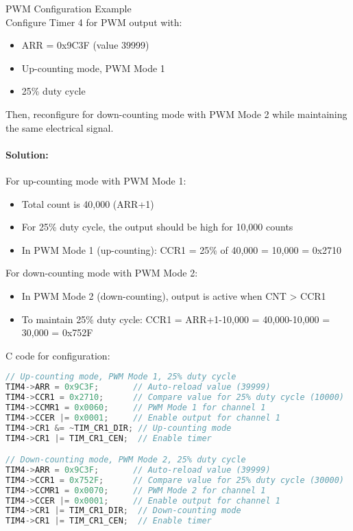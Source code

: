 \begin{example2}{PWM Configuration Example}\\
Configure Timer 4 for PWM output with:
\begin{itemize}
    \item ARR = 0x9C3F (value 39999)
    \item Up-counting mode, PWM Mode 1
    \item 25\% duty cycle
\end{itemize}

Then, reconfigure for down-counting mode with PWM Mode 2 while maintaining the same electrical signal.

\paragraph{Solution:}
For up-counting mode with PWM Mode 1:
\begin{itemize}
    \item Total count is 40,000 (ARR+1)
    \item For 25\% duty cycle, the output should be high for 10,000 counts
    \item In PWM Mode 1 (up-counting): CCR1 = 25\% of 40,000 = 10,000 = 0x2710
\end{itemize}

For down-counting mode with PWM Mode 2:
\begin{itemize}
    \item In PWM Mode 2 (down-counting), output is active when CNT > CCR1
    \item To maintain 25\% duty cycle: CCR1 = ARR+1-10,000 = 40,000-10,000 = 30,000 = 0x752F
\end{itemize}

C code for configuration:
\begin{lstlisting}[language=C, style=basesmol]
// Up-counting mode, PWM Mode 1, 25% duty cycle
TIM4->ARR = 0x9C3F;       // Auto-reload value (39999)
TIM4->CCR1 = 0x2710;      // Compare value for 25% duty cycle (10000)
TIM4->CCMR1 = 0x0060;     // PWM Mode 1 for channel 1
TIM4->CCER |= 0x0001;     // Enable output for channel 1
TIM4->CR1 &= ~TIM_CR1_DIR; // Up-counting mode
TIM4->CR1 |= TIM_CR1_CEN;  // Enable timer

// Down-counting mode, PWM Mode 2, 25% duty cycle
TIM4->ARR = 0x9C3F;       // Auto-reload value (39999)
TIM4->CCR1 = 0x752F;      // Compare value for 25% duty cycle (30000)
TIM4->CCMR1 = 0x0070;     // PWM Mode 2 for channel 1
TIM4->CCER |= 0x0001;     // Enable output for channel 1
TIM4->CR1 |= TIM_CR1_DIR;  // Down-counting mode
TIM4->CR1 |= TIM_CR1_CEN;  // Enable timer
\end{lstlisting}
\end{example2}

